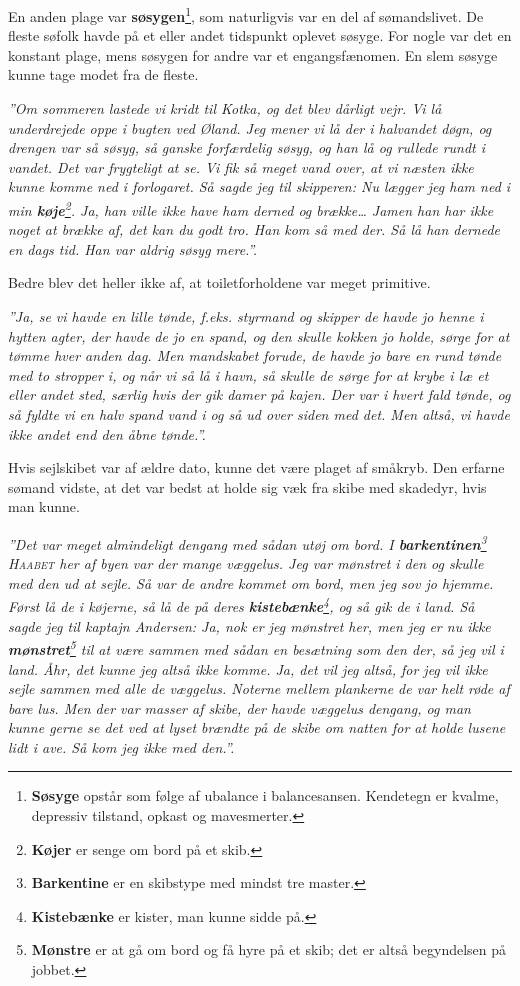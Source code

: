 En anden plage var \textbf{søsygen}\footnote{\textbf{Søsyge} opstår som
  følge af ubalance i balancesansen. Kendetegn er kvalme, depressiv
  tilstand, opkast og mavesmerter.}, som naturligvis var en del af
sømandslivet. De fleste søfolk havde på et eller andet tidspunkt oplevet
søsyge. For nogle var det en konstant plage, mens søsygen for andre var
et engangsfænomen. En slem søsyge kunne tage modet fra de fleste.

\emph{''Om sommeren lastede vi kridt til Kotka, og det blev dårligt
vejr. Vi lå underdrejede oppe i bugten ved Øland. Jeg mener vi lå der i
halvandet døgn, og drengen var så søsyg, så ganske forfærdelig søsyg, og
han lå og rullede rundt i vandet. Det var frygteligt at se. Vi fik så
meget vand over, at vi næsten ikke kunne komme ned i forlogaret. Så
sagde jeg til skipperen: Nu lægger jeg ham ned i min
\textbf{køje}\footnote{\textbf{Køjer} er senge om bord på et skib.}. Ja,
han ville ikke have ham derned og brække\ldots{} Jamen han har ikke
noget at brække af, det kan du godt tro. Han kom så med der. Så lå han
dernede en dags tid. Han var aldrig søsyg mere.''.}

Bedre blev det heller ikke af, at toiletforholdene var meget primitive.

\emph{''Ja, se vi havde en lille tønde, f.eks. styrmand og skipper de
havde jo henne i hytten agter, der havde de jo en spand, og den skulle
kokken jo holde, sørge for at tømme hver anden dag. Men mandskabet
forude, de havde jo bare en rund tønde med to stropper i, og når vi så
lå i havn, så skulle de sørge for at krybe i læ et eller andet sted,
særlig hvis der gik damer på kajen. Der var i hvert fald tønde, og så
fyldte vi en halv spand vand i og så ud over siden med det. Men altså,
vi havde ikke andet end den åbne tønde.''.}

Hvis sejlskibet var af ældre dato, kunne det være plaget af småkryb. Den
erfarne sømand vidste, at det var bedst at holde sig væk fra skibe med
skadedyr, hvis man kunne.

\emph{''Det var meget almindeligt dengang med sådan utøj om bord. I
\textbf{barkentinen}\footnote{\textbf{Barkentine} er en skibstype med
  mindst tre master.} \textsc{Haabet} her af byen var der mange
væggelus. Jeg var mønstret i den og skulle med den ud at sejle. Så var
de andre kommet om bord, men jeg sov jo hjemme. Først lå de i køjerne,
så lå de på deres \textbf{kistebænke}\footnote{\textbf{Kistebænke} er
  kister, man kunne sidde på.}, og så gik de i land. Så sagde jeg til
kaptajn Andersen: Ja, nok er jeg mønstret her, men jeg er nu ikke
\textbf{mønstret}\footnote{\textbf{Mønstre} er at gå om bord og få hyre
  på et skib; det er altså begyndelsen på jobbet.} til at være sammen
med sådan en besætning som den der, så jeg vil i land. Åhr, det kunne
jeg altså ikke komme. Ja, det vil jeg altså, for jeg vil ikke sejle
sammen med alle de væggelus. Noterne mellem plankerne de var helt røde
af bare lus. Men der var masser af skibe, der havde væggelus dengang, og
man kunne gerne se det ved at lyset brændte på de skibe om natten for at
holde lusene lidt i ave. Så kom jeg ikke med den.''.}

